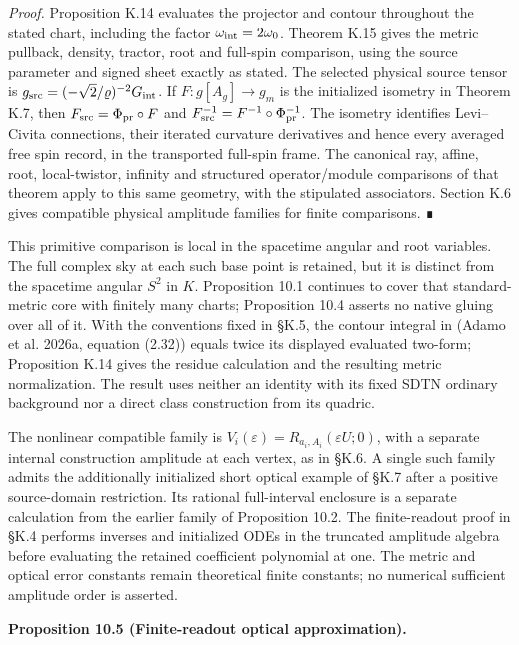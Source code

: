 \documentclass[
  english,
  11pt,
  reqno]{amsart}
\makeatletter
\newcommand{\pandocstatementheading}[1]{%
  \par\addpenalty{\@beginparpenalty}%
  \addvspace{.5\baselineskip plus .2\baselineskip minus .2\baselineskip}%
  {\normalfont\bfseries #1\par}%
  \nobreak\@afterindenttrue\@afterheading
}
\makeatother
\begin{document}
\emph{Proof.} Proposition K.14 evaluates the projector and contour
throughout the stated chart, including the factor
\(\omega_{\rm int}=2\omega_0\). Theorem K.15 gives the metric pullback,
density, tractor, root and full-spin comparison, using the source
parameter and signed sheet exactly as stated. The selected physical
source tensor is \(g_{\rm src}=(-\sqrt2/\varrho)^{-2}G_{\rm int}\). If
\(F:g[A_g]\to g_m\) is the initialized isometry in Theorem K.7, then
\(F_{\rm src}=\Phi_{\rm pr}\circ F\) and
\(F_{\rm src}^{-1}=F^{-1}\circ\Phi_{\rm pr}^{-1}\). The isometry
identifies Levi--Civita connections, their iterated curvature
derivatives and hence every averaged free spin record, in the
transported full-spin frame. The canonical ray, affine, root,
local-twistor, infinity and structured operator/module comparisons of
that theorem apply to this same geometry, with the stipulated
associators. Section K.6 gives compatible physical amplitude families
for finite comparisons. ∎

This primitive comparison is local in the spacetime angular and root
variables. The full complex sky at each such base point is retained, but
it is distinct from the spacetime angular \(S^2\) in \(K\). Proposition
10.1 continues to cover that standard-metric core with finitely many
charts; Proposition 10.4 asserts no native gluing over all of it. With
the conventions fixed in §K.5, the contour integral in (Adamo et al.
2026a, equation (2.32)) equals twice its displayed evaluated two-form;
Proposition K.14 gives the residue calculation and the resulting metric
normalization. The result uses neither an identity with its fixed SDTN
ordinary background nor a direct class construction from its quadric.

The nonlinear compatible family is
\(V_i(\varepsilon)=R_{a_i,A_i}(\varepsilon U;0)\), with a separate
internal construction amplitude at each vertex, as in §K.6. A single
such family admits the additionally initialized short optical example of
§K.7 after a positive source-domain restriction. Its rational
full-interval enclosure is a separate calculation from the earlier
family of Proposition 10.2. The finite-readout proof in §K.4 performs
inverses and initialized ODEs in the truncated amplitude algebra before
evaluating the retained coefficient polynomial at one. The metric and
optical error constants remain theoretical finite constants; no
numerical sufficient amplitude order is asserted.

\pandocstatementheading{
\protect\phantomsection\label{prop:gg-schwarzschild-finite-readout}Proposition 10.5 (Finite-readout optical approximation).}
\end{document}
